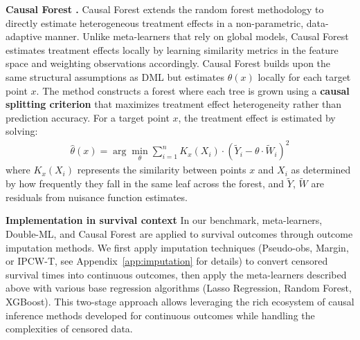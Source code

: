 \documentclass{article} %
\begin{document}
\textbf{Causal Forest \citep{athey2019grf}.} Causal Forest extends the random forest methodology to directly estimate heterogeneous treatment effects in a non-parametric, data-adaptive manner. Unlike meta-learners that rely on global models, Causal Forest estimates treatment effects locally by learning similarity metrics in the feature space and weighting observations accordingly. Causal Forest builds upon the same structural assumptions as DML but estimates $\theta(x)$ locally for each target point $x$. The method constructs a forest where each tree is grown using a \textbf{causal splitting criterion} that maximizes treatment effect heterogeneity rather than prediction accuracy. For a target point $x$, the treatment effect is estimated by solving:
\begin{align*}
    \hat{\theta}(x) = \arg\min_{\theta} \sum_{i=1}^n K_x(X_i) \cdot (\tilde{Y}_i - \theta \cdot \tilde{W}_i)^2
\end{align*}
where $K_x(X_i)$ represents the similarity between points $x$ and $X_i$ as determined by how frequently they fall in the same leaf across the forest, and $\tilde{Y}$, $\tilde{W}$ are residuals from nuisance function estimates.

\textbf{Implementation in survival context}
In our benchmark, meta-learners, Double-ML, and Causal Forest are applied to survival outcomes through outcome imputation methods. We first apply imputation techniques (Pseudo-obs, Margin, or IPCW-T, see Appendix~\ref{app:imputation} for details) to convert censored survival times into continuous outcomes, then apply the meta-learners described above with various base regression algorithms (Lasso Regression, Random Forest, XGBoost). This two-stage approach allows leveraging the rich ecosystem of causal inference methods developed for continuous outcomes while handling the complexities of censored data.
\end{document}
